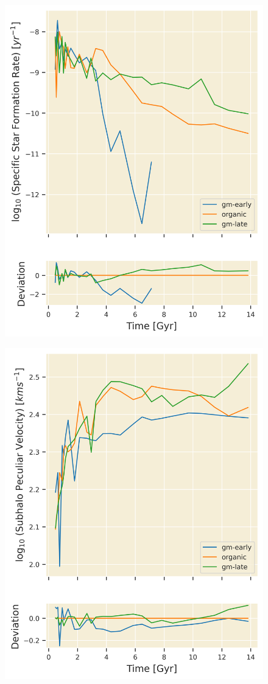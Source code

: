 \documentclass[twocolumn]{article}
\begin{document}
	\begin{figure}
			\centering 
			\includegraphics[width=\columnwidth]{./sSFR.png}
	\end{figure}

	\begin{figure}
			\centering 
			\includegraphics[width=\columnwidth]{./subhalo_peculiar_velocity.png}
	\end{figure}
\end{document}
